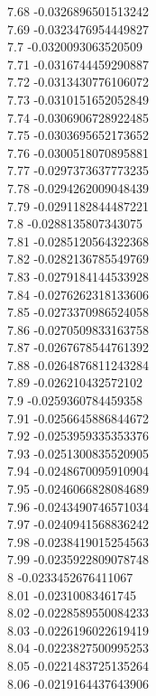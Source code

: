 {7.68	-0.0326896501513242\\
7.69	-0.0323476954449827\\
7.7	-0.0320093063520509\\
7.71	-0.0316744459290887\\
7.72	-0.0313430776106072\\
7.73	-0.0310151652052849\\
7.74	-0.0306906728922485\\
7.75	-0.0303695652173652\\
7.76	-0.0300518070895881\\
7.77	-0.0297373637773235\\
7.78	-0.0294262009048439\\
7.79	-0.0291182844487221\\
7.8	-0.0288135807343075\\
7.81	-0.0285120564322368\\
7.82	-0.0282136785549769\\
7.83	-0.0279184144533928\\
7.84	-0.0276262318133606\\
7.85	-0.0273370986524058\\
7.86	-0.0270509833163758\\
7.87	-0.0267678544761392\\
7.88	-0.0264876811243284\\
7.89	-0.026210432572102\\
7.9	-0.0259360784459358\\
7.91	-0.0256645886844672\\
7.92	-0.0253959335353376\\
7.93	-0.0251300835520905\\
7.94	-0.0248670095910904\\
7.95	-0.0246066828084689\\
7.96	-0.0243490746571034\\
7.97	-0.0240941568836242\\
7.98	-0.0238419015254563\\
7.99	-0.0235922809078748\\
8	-0.0233452676411067\\
8.01	-0.02310083461745\\
8.02	-0.0228589550084233\\
8.03	-0.0226196022619419\\
8.04	-0.0223827500995253\\
8.05	-0.0221483725135264\\
8.06	-0.0219164437643906\\
}
